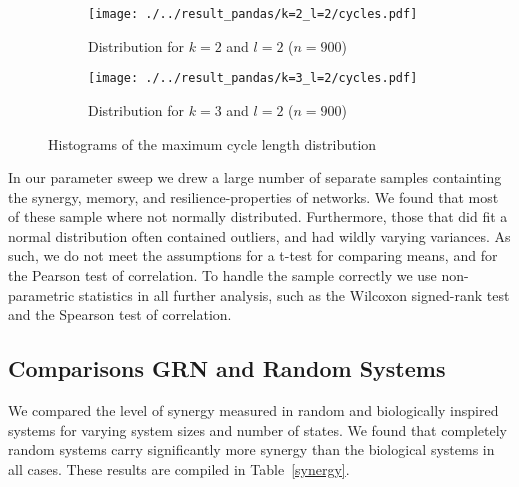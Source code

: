 \documentclass[../main.tex]{subfiles}
\begin{document}
\begin{figure}[H]
    \centering
    \begin{subfigure}[b]{0.4\textwidth}
        \texttt{[image: ./../result\_pandas/k=2\_l=2/cycles.pdf]}
        \caption{Distribution for $k=2$ and $l=2$ ($n=900$)}
    \end{subfigure}
    \begin{subfigure}[b]{0.4\textwidth}
        \texttt{[image: ./../result\_pandas/k=3\_l=2/cycles.pdf]}
        \caption{Distribution for $k=3$ and $l=2$ ($n=900$)}
    \end{subfigure}
    \caption{Histograms of the maximum cycle length distribution}
    \label{fig:cycles}
\end{figure}


In our parameter sweep we drew a large number of separate samples containting the synergy, memory, and resilience-properties of networks.
We found that most of these sample where not normally distributed.
Furthermore, those that did fit a normal distribution often contained outliers, and had wildly varying variances.
As such, we do not meet the assumptions for a t-test for comparing means, and for the Pearson test of correlation.
To handle the sample correctly we use non-parametric statistics in all further analysis, such as the Wilcoxon signed-rank test and the Spearson test of correlation. %

\subsection{Comparisons GRN and Random Systems}

We compared the level of synergy measured in random and biologically inspired systems for varying system sizes and number of states.
We found that completely random systems carry significantly more synergy than the biological systems in all cases.
These results are compiled in Table~\ref{synergy}.
\end{document}
